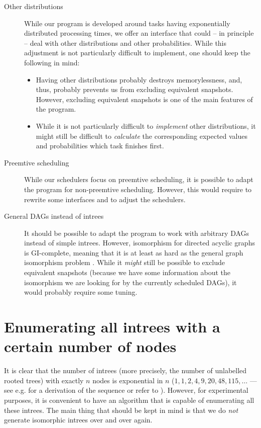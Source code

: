 \begin{description}
\item[Other distributions] While our program is developed around tasks having exponentially distributed processing times, we offer an interface that could -- in principle -- deal with other distributions and other probabilities. While this adjustment is not particularly difficult to implement, one should keep the following in mind:
  \begin{itemize}
  \item Having other distributions probably destroys memorylessness, and, thus, probably prevents us from excluding equivalent snapshots. However, excluding equivalent snapshots is one of the main features of the program.
  \item While it is not particularly difficult to \emph{implement} other distributions, it might still be difficult to \emph{calculate} the corresponding expected values and probabilities which task finishes first.
  \end{itemize}
\item[Preemtive scheduling] While our schedulers focus on preemtive scheduling, it is possible to adapt the program for non-preemtive scheduling. However, this would require to rewrite some interfaces and to adjust the schedulers.
\item[General DAGs instead of intrees] It should be possible to adapt the program to work with arbitrary DAGs instead of simple intrees. However, isomorphism for directed acyclic graphs is GI-complete, meaning that it is at least as hard as the general graph isomorphism problem \cite{graphisomorphismproblem}. While it \emph{might} still be possible to exclude equivalent snapshots (because we have some information about the isomorphism we are looking for by the currently scheduled DAGs), it would probably require some tuning.
\end{description}

\section{Enumerating all intrees with a certain number of nodes}
\label{sec:enumerating-all-intrees}

It is clear that the number of intrees (more precisely, the number of unlabelled rooted trees) with exactly $n$ nodes is exponential in $n$ ($1, 1, 2, 4, 9, 20, 48, 115,\dots$ --- see e.g. \cite{flajolet2009analytic} for a derivation of the sequence or refer to \cite{oeisrootedtrees}). However, for experimental purposes, it is convenient to have an algorithm that is capable of enumerating all these intrees. The main thing that should be kept in mind is that we do \emph{not} generate isomorphic intrees over and over again.

